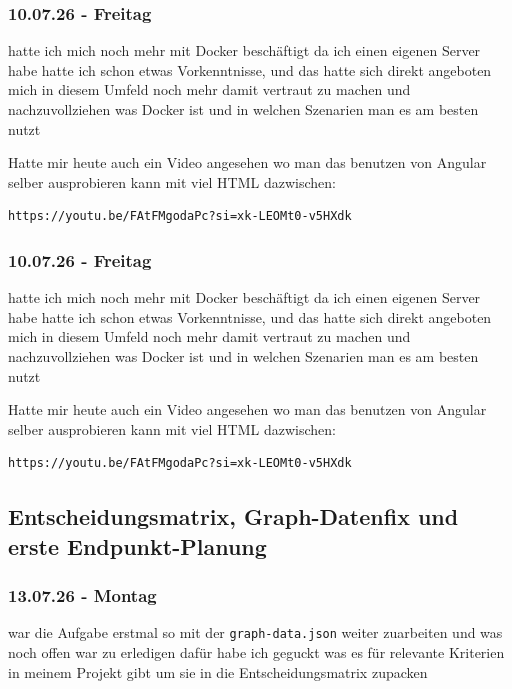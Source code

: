 \subsubsection{10.07.26 - Freitag}

hatte ich mich noch mehr mit Docker beschäftigt da ich einen eigenen Server habe hatte ich schon etwas Vorkenntnisse, und das hatte sich direkt angeboten mich in diesem Umfeld noch mehr damit vertraut zu machen und nachzuvollziehen was Docker ist und in welchen Szenarien man es am besten nutzt

Hatte mir heute auch ein Video angesehen wo man das benutzen von Angular selber ausprobieren kann mit viel HTML dazwischen:

\begin{verbatim}
https://youtu.be/FAtFMgodaPc?si=xk-LEOMt0-v5HXdk
\end{verbatim}

\subsubsection{10.07.26 - Freitag}

hatte ich mich noch mehr mit Docker beschäftigt da ich einen eigenen Server habe hatte ich schon etwas Vorkenntnisse, und das hatte sich direkt angeboten mich in diesem Umfeld noch mehr damit vertraut zu machen und nachzuvollziehen was Docker ist und in welchen Szenarien man es am besten nutzt

Hatte mir heute auch ein Video angesehen wo man das benutzen von Angular selber ausprobieren kann mit viel HTML dazwischen:

\begin{verbatim}
https://youtu.be/FAtFMgodaPc?si=xk-LEOMt0-v5HXdk
\end{verbatim}

\subsection{Entscheidungsmatrix, Graph-Datenfix und erste Endpunkt-Planung}
\subsubsection{13.07.26 - Montag}

war die Aufgabe erstmal so mit der \texttt{graph-data.json} weiter zuarbeiten und was noch offen war zu erledigen dafür habe ich geguckt was es für relevante Kriterien in meinem Projekt gibt um sie in die Entscheidungsmatrix zupacken

